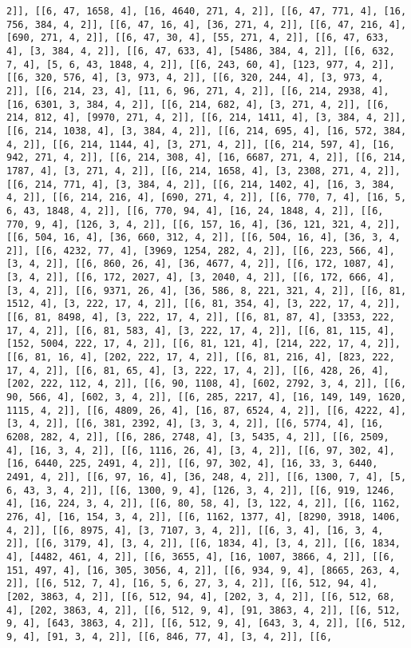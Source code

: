 \documentclass[12pt,fleqn]{article}\usepackage{../../common}
\begin{document}
\begin{verbatim}
2]], [[6, 47, 1658, 4], [16, 4640, 271, 4, 2]], [[6, 47, 771, 4], [16, 756, 384, 4, 2]], [[6, 47, 16, 4], [36, 271, 4, 2]], [[6, 47, 216, 4], [690, 271, 4, 2]], [[6, 47, 30, 4], [55, 271, 4, 2]], [[6, 47, 633, 4], [3, 384, 4, 2]], [[6, 47, 633, 4], [5486, 384, 4, 2]], [[6, 632, 7, 4], [5, 6, 43, 1848, 4, 2]], [[6, 243, 60, 4], [123, 977, 4, 2]], [[6, 320, 576, 4], [3, 973, 4, 2]], [[6, 320, 244, 4], [3, 973, 4, 2]], [[6, 214, 23, 4], [11, 6, 96, 271, 4, 2]], [[6, 214, 2938, 4], [16, 6301, 3, 384, 4, 2]], [[6, 214, 682, 4], [3, 271, 4, 2]], [[6, 214, 812, 4], [9970, 271, 4, 2]], [[6, 214, 1411, 4], [3, 384, 4, 2]], [[6, 214, 1038, 4], [3, 384, 4, 2]], [[6, 214, 695, 4], [16, 572, 384, 4, 2]], [[6, 214, 1144, 4], [3, 271, 4, 2]], [[6, 214, 597, 4], [16, 942, 271, 4, 2]], [[6, 214, 308, 4], [16, 6687, 271, 4, 2]], [[6, 214, 1787, 4], [3, 271, 4, 2]], [[6, 214, 1658, 4], [3, 2308, 271, 4, 2]], [[6, 214, 771, 4], [3, 384, 4, 2]], [[6, 214, 1402, 4], [16, 3, 384, 4, 2]], [[6, 214, 216, 4], [690, 271, 4, 2]], [[6, 770, 7, 4], [16, 5, 6, 43, 1848, 4, 2]], [[6, 770, 94, 4], [16, 24, 1848, 4, 2]], [[6, 770, 9, 4], [126, 3, 4, 2]], [[6, 157, 16, 4], [36, 121, 321, 4, 2]], [[6, 504, 16, 4], [36, 660, 312, 4, 2]], [[6, 504, 16, 4], [36, 3, 4, 2]], [[6, 4232, 77, 4], [3969, 1254, 282, 4, 2]], [[6, 223, 566, 4], [3, 4, 2]], [[6, 860, 26, 4], [36, 4677, 4, 2]], [[6, 172, 1087, 4], [3, 4, 2]], [[6, 172, 2027, 4], [3, 2040, 4, 2]], [[6, 172, 666, 4], [3, 4, 2]], [[6, 9371, 26, 4], [36, 586, 8, 221, 321, 4, 2]], [[6, 81, 1512, 4], [3, 222, 17, 4, 2]], [[6, 81, 354, 4], [3, 222, 17, 4, 2]], [[6, 81, 8498, 4], [3, 222, 17, 4, 2]], [[6, 81, 87, 4], [3353, 222, 17, 4, 2]], [[6, 81, 583, 4], [3, 222, 17, 4, 2]], [[6, 81, 115, 4], [152, 5004, 222, 17, 4, 2]], [[6, 81, 121, 4], [214, 222, 17, 4, 2]], [[6, 81, 16, 4], [202, 222, 17, 4, 2]], [[6, 81, 216, 4], [823, 222, 17, 4, 2]], [[6, 81, 65, 4], [3, 222, 17, 4, 2]], [[6, 428, 26, 4], [202, 222, 112, 4, 2]], [[6, 90, 1108, 4], [602, 2792, 3, 4, 2]], [[6, 90, 566, 4], [602, 3, 4, 2]], [[6, 285, 2217, 4], [16, 149, 149, 1620, 1115, 4, 2]], [[6, 4809, 26, 4], [16, 87, 6524, 4, 2]], [[6, 4222, 4], [3, 4, 2]], [[6, 381, 2392, 4], [3, 3, 4, 2]], [[6, 5774, 4], [16, 6208, 282, 4, 2]], [[6, 286, 2748, 4], [3, 5435, 4, 2]], [[6, 2509, 4], [16, 3, 4, 2]], [[6, 1116, 26, 4], [3, 4, 2]], [[6, 97, 302, 4], [16, 6440, 225, 2491, 4, 2]], [[6, 97, 302, 4], [16, 33, 3, 6440, 2491, 4, 2]], [[6, 97, 16, 4], [36, 248, 4, 2]], [[6, 1300, 7, 4], [5, 6, 43, 3, 4, 2]], [[6, 1300, 9, 4], [126, 3, 4, 2]], [[6, 919, 1246, 4], [16, 224, 3, 4, 2]], [[6, 80, 58, 4], [3, 122, 4, 2]], [[6, 1162, 276, 4], [16, 154, 3, 4, 2]], [[6, 1162, 1377, 4], [8290, 3918, 1406, 4, 2]], [[6, 8975, 4], [3, 7107, 3, 4, 2]], [[6, 3, 4], [16, 3, 4, 2]], [[6, 3179, 4], [3, 4, 2]], [[6, 1834, 4], [3, 4, 2]], [[6, 1834, 4], [4482, 461, 4, 2]], [[6, 3655, 4], [16, 1007, 3866, 4, 2]], [[6, 151, 497, 4], [16, 305, 3056, 4, 2]], [[6, 934, 9, 4], [8665, 263, 4, 2]], [[6, 512, 7, 4], [16, 5, 6, 27, 3, 4, 2]], [[6, 512, 94, 4], [202, 3863, 4, 2]], [[6, 512, 94, 4], [202, 3, 4, 2]], [[6, 512, 68, 4], [202, 3863, 4, 2]], [[6, 512, 9, 4], [91, 3863, 4, 2]], [[6, 512, 9, 4], [643, 3863, 4, 2]], [[6, 512, 9, 4], [643, 3, 4, 2]], [[6, 512, 9, 4], [91, 3, 4, 2]], [[6, 846, 77, 4], [3, 4, 2]], [[6, 
\end{verbatim}
\end{document}
